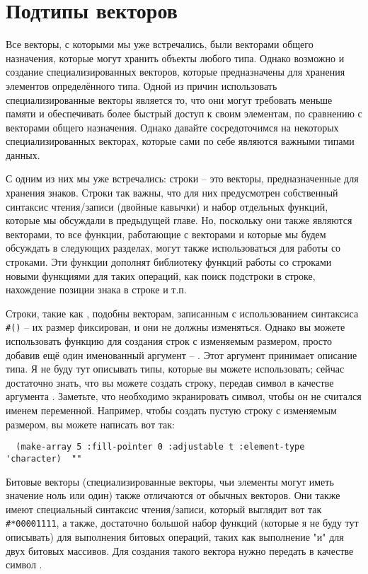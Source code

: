 \section{Подтипы векторов}

Все векторы, с которыми мы уже встречались, были векторами общего назначения, которые
могут хранить объекты любого типа.  Однако возможно и создание специализированных
векторов, которые предназначены для хранения элементов определённого типа.  Одной из
причин использовать специализированные векторы является то, что они могут требовать
меньше памяти и обеспечивать более быстрый доступ к своим элементам, по сравнению с
векторами общего назначения.  Однако давайте сосредоточимся на некоторых
специализированных векторах, которые сами по себе являются важными типами данных.

С одним из них мы уже встречались: строки -- это векторы, предназначенные для хранения
знаков.  Строки так важны, что для них предусмотрен собственный синтаксис чтения/записи
(двойные кавычки) и набор отдельных функций, которые мы обсуждали в предыдущей главе.  Но,
поскольку они также являются векторами, то все функции, работающие с векторами и которые мы
будем обсуждать в следующих разделах, могут также использоваться для работы со строками.
Эти функции дополнят библиотеку функций работы со строками новыми функциями для таких
операций, как поиск подстроки в строке, нахождение позиции знака в строке и т.п.

Строки, такие как , подобны векторам, записанным с использованием синтаксиса
\lstinline!#()! -- их размер фиксирован, и они не должны изменяться.  Однако вы можете
использовать функцию  для создания строк с изменяемым размером, просто
добавив ещё один именованный аргумент -- .  Этот аргумент принимает
описание типа.  Я не буду тут описывать типы, которые вы можете использовать; сейчас
достаточно знать, что вы можете создать строку, передав символ  в
качестве аргумента .  Заметьте, что необходимо экранировать
символ, чтобы он не считался именем переменной.  Например, чтобы создать пустую строку с
изменяемым размером, вы можете написать вот так:

\begin{verbatim}
  (make-array 5 :fill-pointer 0 :adjustable t :element-type 'character)  ""
\end{verbatim}

Битовые векторы (специализированные векторы, чьи элементы могут иметь значение ноль или
один) также отличаются от обычных векторов.  Они также имеют специальный синтаксис
чтения/записи, который выглядит вот так \lstinline!#*00001111!, а также, достаточно большой
набор функций (которые я не буду тут описывать) для выполнения битовых операций, таких как
выполнение "и" для двух битовых массивов.  Для создания такого вектора нужно передать
в качестве  символ .

